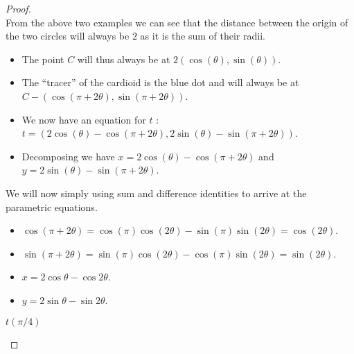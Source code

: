 \documentclass[12pt]{article}
\theoremstyle{plain}
\begin{document}
\begin{proof}
  \ \\

  From the above two examples we can see that the distance between the origin of the two circles will always be $ 2 $ as it is the sum of their radii.

  \begin{itemize}
    \item The point $ C $ will thus always be at $ 2 (\cos(\theta), \sin(\theta)) $.
    \item The ``tracer'' of the cardioid is the blue dot and will always be at $ C - (\cos(\pi + 2\theta), \sin(\pi + 2\theta)) $.
    \item We now have an equation for $ t $ : $ t = (2\cos(\theta) - \cos(\pi + 2\theta), 2\sin(\theta) - \sin(\pi + 2\theta)) $.
    \item Decomposing we have $ x = 2\cos(\theta) - \cos(\pi + 2\theta) $ and $ y = 2\sin(\theta) - \sin(\pi + 2\theta) $.
  \end{itemize}
    We will now simply using sum and difference identities to arrive at the parametric equations. 
    \begin{itemize}
    \item $ \cos(\pi + 2\theta) = \cos(\pi)\cos(2\theta) - \sin(\pi)\sin(2\theta) = \cos(2\theta) $.
    \item $ \sin(\pi + 2\theta) = \sin(\pi)\cos(2\theta) - \cos(\pi)\sin(2\theta) = \sin(2\theta) $.
    \item $ x = 2\cos\theta - \cos2\theta $.
    \item $ y = 2\sin\theta - \sin2\theta $.
  \end{itemize}

  \begin{center}
  
    $ t(\pi/4) $
  \end{center}

\end{proof}
\end{document}
